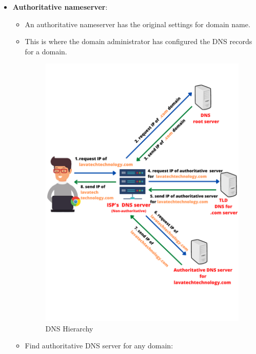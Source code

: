 
\setlength{\columnsep}{3pt}
\begin{flushleft}
	\bigskip
	\begin{itemize}
		\item \textbf{Authoritative nameserver}:
		\begin{itemize}
			\item An authoritative nameserver has the original settings for domain name.
			\item This is where the domain administrator has configured the DNS records for a domain. 
			
			\begin{figure}[h!]
				\centering
				\includegraphics[scale=.48]{content/chapter3/images/auth.png}
				\caption{DNS Hierarchy}
				\label{fig:dns_heir}
			\end{figure}
			\newpage
			\item Find authoritative DNS server for any domain:
			\begin{tcolorbox}[breakable,notitle,boxrule=0pt,colback=pink,colframe=pink]

\end{tcolorbox}
\end{itemize}
\end{itemize}
\end{flushleft}

